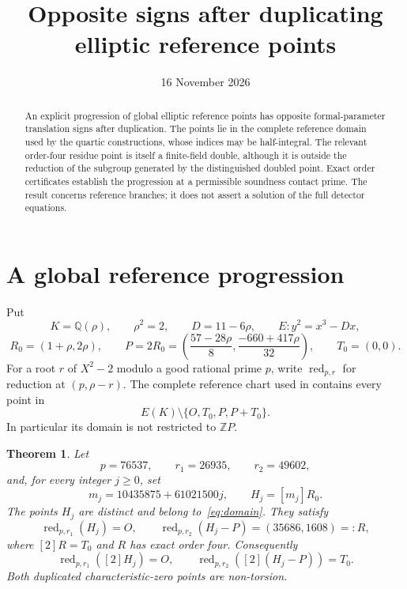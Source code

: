 \documentclass[11pt,a4paper]{article}
\title{Opposite signs after duplicating elliptic reference points}
\author{}\date{16 November 2026}
\newtheorem{theorem}{Theorem}[section]
\newcommand{\Q}{\mathbb Q}\newcommand{\Z}{\mathbb Z}
\begin{document}
\maketitle
\begin{abstract}
An explicit progression of global elliptic reference points has opposite
formal-parameter translation signs after duplication. The points lie in
the complete reference domain used by the quartic constructions, whose
indices may be half-integral. The relevant order-four residue point is
itself a finite-field double, although it is outside the reduction of
the subgroup generated by the distinguished doubled point. Exact order
certificates establish the progression at a permissible soundness contact
prime. The result concerns reference branches; it does not assert a
solution of the full detector equations.
\end{abstract}

\section{A global reference progression}

Put
\[
 K=\Q(\rho),\qquad \rho^2=2,\qquad D=11-6\rho,
 \qquad E:y^2=x^3-Dx,
\]
\[
 R_0=(1+\rho,2\rho),\qquad
 P=2R_0=\left(\frac{57-28\rho}{8},
                  \frac{-660+417\rho}{32}\right),
 \qquad T_0=(0,0).
\]
For a root $r$ of $X^2-2$ modulo a good rational prime $p$, write
$\operatorname{red}_{p,r}$ for reduction at $(p,\rho-r)$.
The complete reference chart used in \cite{ABC79,ABC78,Chart}
contains every point in
\begin{equation}\label{eq:domain}
                    E(K)\setminus\{O,T_0,P,P+T_0\}.
\end{equation}
In particular its domain is not restricted to $\Z P$.

\begin{samepage}
\begin{theorem}\label{thm:progression}
Let
\[
 p=76537,\qquad r_1=26935,\qquad r_2=49602,
\]
and, for every integer $j\ge0$, set
\[
 m_j=10435875+61021500j,\qquad H_j=[m_j]R_0.
\]
The points $H_j$ are distinct and belong to~\eqref{eq:domain}. They satisfy
\[
 \operatorname{red}_{p,r_1}(H_j)=O,
 \qquad
 \operatorname{red}_{p,r_2}(H_j-P)=(35686,1608)=:R,
\]
where $[2]R=T_0$ and $R$ has exact order four. Consequently
\[
 \operatorname{red}_{p,r_1}([2]H_j)=O,
 \qquad
 \operatorname{red}_{p,r_2}([2](H_j-P))=T_0.
\]
Both duplicated characteristic-zero points are non-torsion.
\end{theorem}
\end{samepage}
\end{document}
